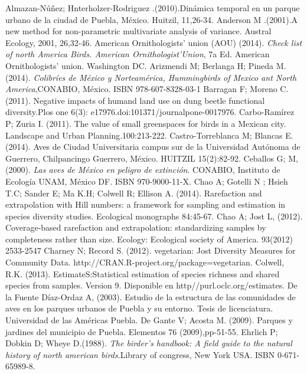 \documentclass[letterpaper,12pt]{article}
\begin{document}
\begin{thebibliography}{37}
Almazan-Núñez; Hnterholzer-Rodriguez .(2010).Dinámica temporal en un parque urbano de la ciudad de Puebla, México. Huitzil, 11,26-34. 
Anderson M .(2001).A new method for non-parametric multivariate analysis of variance. Austral Ecology, 2001, 26,32-46. 
American  Ornithologists' union (AOU) (2014). \textit{Check list of north America Birds. American Ornithologist'Union}, 7a Ed. American Ornithologists' union. Washington DC.
Arizmendi  M; Berlanga H; Pineda M. (2014). \textit{Colibríes de México y Norteamérica, Hummingbirds of Mexico ant North America},CONABIO, México. ISBN 978-607-8328-03-1
Barragan F; Moreno C. (2011). Negative impacts of humand land use on dung beetle functional diversity.Plos one 6(3): e17976.doi:101371/journalpone-0017976.
Carbo-Ramírez P; Zuria I. (2011). The value of small greenspaces for birds in a Mexican city. Landscape and Urban Planning.100:213-222.
Castro-Torreblanca M; Blancas E. (2014). Aves de Ciudad Universitaria campus sur de la Universidad Autónoma de Guerrero, Chilpancingo Guerrero, México. HUITZIL 15(2):82-92.
Ceballos  G; M, (2000). \textit{Las aves de México en peligro de extinción}. CONABIO, Instituto de Ecología UNAM, México DF. ISBN 970-9000-11-X.
Chao A; Gotelli N ; Hsieh T.C; Sander E; Ma K.H; Colwell R; Ellison A. (2014). Rarefaction and extrapolation with Hill numbers: a framework for sampling and estimation in species diversity studies. Ecological monographs 84:45-67. 
Chao A; Jost L, (2012). Coverage-based rarefaction and extrapolation: standardizing samples by completeness rather than size. Ecology: Ecological society of America. 93(2012) 2533-2547
\bibitem{}Charney N; Record S. (2012). vegetarian: Jost Diversity Measures for Community Data. http://CRAN.R-project.org/package=vegetarian.
\bibitem{}Colwell, R.K. (2013). EstimateS:Statistical estimation of species richness and shared species from samples. Version 9. Disponible en http//purl.oclc.org/estimates.
\bibitem{} De la Fuente Díaz-Ordaz A, (2003). Estudio de la estructura de las comunidades de aves en los parques urbanos de Puebla y su entorno. Tesis de licenciatura. Universidad de las Américas Puebla.
De Gante V; Acosta M. (2009). Parques y jardines del municipio de Puebla. Elementos 76 (2009),pp-51-55.
Ehrlich P; Dobkin D; Wheye D.(1988). \textit{The birder's handbook: A field guide to the natural history of north american birds}.Library of congress, New York USA. ISBN 0-671-65989-8.  

\end{thebibliography}
\end{document}

